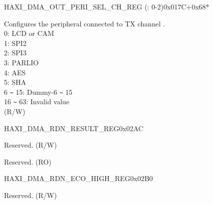 \begin{register}{H}{AXI\_DMA\_OUT\_PERI\_SEL\_CH\_REG (: 0-2)}{0x017C+0x68*}\label{regdesc:AXIDMAOUTPERISELCHNREG}
%
%
\regnewline%
\begin{regdesc}\begin{reglist}
\label{fielddesc:AXIDMAPERIOUTSELCHN}\item [AXI\_DMA\_PERI\_OUT\_SEL\_CH\regindex{n}] Configures the peripheral connected to TX channel .\\ 0: LCD or CAM\\ 1: SPI2\\ 2: SPI3\\ 3: PARLIO\\ 4: AES\\ 5: SHA\\ 6 \verb+~+ 15: Dummy-6 \verb+~+ 15\\ 16 \verb+~+ 63: Invalid value\\ (R/W)
\end{reglist}\end{regdesc}
\end{register}


\begin{register}{H}{AXI\_DMA\_RDN\_RESULT\_REG}{0x02AC}\label{regdesc:AXIDMARDNRESULTREG}
%
%
%
\regnewline%
\begin{regdesc}\begin{reglist}
\label{fielddesc:AXIDMARDNENA}\item [AXI\_DMA\_RDN\_ENA] Reserved. (R/W)
\label{fielddesc:AXIDMARDNRESULT}\item [AXI\_DMA\_RDN\_RESULT] Reserved. (RO)
\end{reglist}\end{regdesc}
\end{register}


\begin{register}{H}{AXI\_DMA\_RDN\_ECO\_HIGH\_REG}{0x02B0}\label{regdesc:AXIDMARDNECOHIGHREG}
%
\regnewline%
\begin{regdesc}\begin{reglist}
\label{fielddesc:AXIDMARDNECOHIGH}\item [AXI\_DMA\_RDN\_ECO\_HIGH] Reserved. (R/W)
\end{reglist}\end{regdesc}
\end{register}


